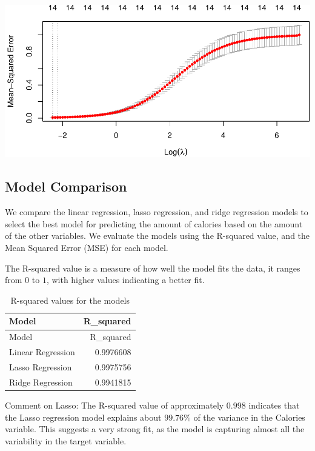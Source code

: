 \documentclass[
]{article}
\begin{document}
\begin{center}\includegraphics{Statistical_Learning_Final_Report_files/figure-latex/ridge_regression-1} \end{center}

\subsection{Model Comparison}\label{model-comparison}

We compare the linear regression, lasso regression, and ridge regression
models to select the best model for predicting the amount of calories
based on the amount of the other variables. We evaluate the models using
the R-squared value, and the Mean Squared Error (MSE) for each model.

The R-squared value is a measure of how well the model fits the data, it
ranges from \(0\) to \(1\), with higher values indicating a better fit.

\begin{longtable}[]{@{}lr@{}}
\caption{R-squared values for the models}\tabularnewline
\toprule\noalign{}
Model & R\_squared \\
\midrule\noalign{}
\endfirsthead
\toprule\noalign{}
Model & R\_squared \\
\midrule\noalign{}
\endhead
\bottomrule\noalign{}
\endlastfoot
Linear Regression & 0.9976608 \\
Lasso Regression & 0.9975756 \\
Ridge Regression & 0.9941815 \\
\end{longtable}

Comment on Lasso: The R-squared value of approximately \(0.998\)
indicates that the Lasso regression model explains about \(99.76\)\% of
the variance in the Calories variable. This suggests a very strong fit,
as the model is capturing almost all the variability in the target
variable.
\end{document}
